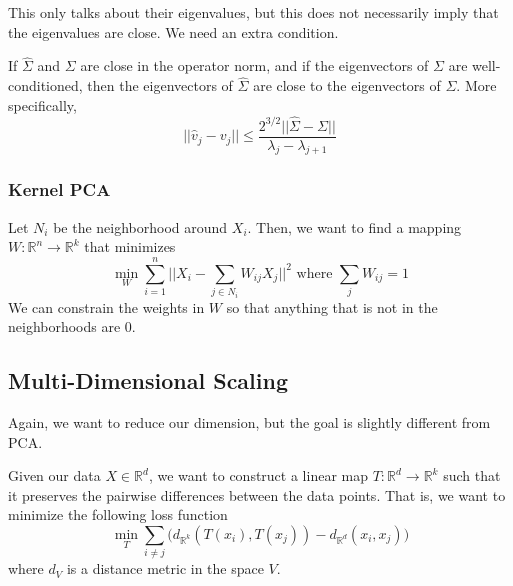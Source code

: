     This only talks about their eigenvalues, but this does not necessarily imply that the eigenvalues are close. We need an extra condition. 

    \begin{theorem}
      If $\hat{\Sigma}$ and $\Sigma$ are close in the operator norm, and if the eigenvectors of $\Sigma$ are well-conditioned, then the eigenvectors of $\hat{\Sigma}$ are close to the eigenvectors of $\Sigma$. More specifically, 
      \begin{equation}
        ||\hat{v}_j - v_j|| \leq \frac{2^{3/2} ||\hat{\Sigma} - \Sigma||}{\lambda_j - \lambda_{j+1}}
      \end{equation}
    \end{theorem}

    \subsubsection{Kernel PCA}

      \begin{definition}
        Let $N_i$ be the neighborhood around $X_i$. Then, we want to find a mapping $W: \mathbb{R}^n \rightarrow \mathbb{R}^k$ that minimizes 
        \begin{equation}
          \min_{W} \sum_{i=1}^n \bigg| \bigg| X_i - \sum_{j \in N_i} W_{ij} X_j \bigg| \bigg|^2 \text{ where } \sum_{j} W_{ij} = 1
        \end{equation}
        We can constrain the weights in $W$ so that anything that is not in the neighborhoods are $0$. 
      \end{definition}

  \subsection{Multi-Dimensional Scaling}

    Again, we want to reduce our dimension, but the goal is slightly different from PCA. 

    \begin{definition}
      Given our data $X \in \mathbb{R}^d$, we want to construct a linear map $T: \mathbb{R}^d \rightarrow \mathbb{R}^k$ such that it preserves the pairwise differences between the data points. That is, we want to minimize the following loss function 
      \begin{equation}
        \min_{T} \sum_{i \neq j} \big( d_{\mathbb{R}^k}(T(x_i), T(x_j)) - d_{\mathbb{R}^d}(x_i, x_j) \big)
      \end{equation}
      where $d_{V}$ is a distance metric in the space $V$. 
    \end{definition}

